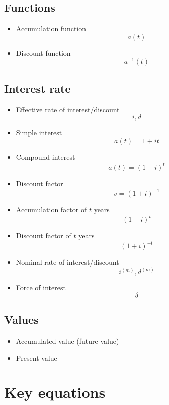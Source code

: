 \documentclass[
]{book}
\begin{document}
\hypertarget{functions}{%
\subsection*{Functions}\label{functions}}

\begin{itemize}
\item
  Accumulation function \[a(t)\]
\item
  Discount function \[a^{-1}(t)\]
\end{itemize}

\hypertarget{interest-rate-1}{%
\subsection*{Interest rate}\label{interest-rate-1}}

\begin{itemize}
\item
  Effective rate of interest/discount \[i,d\]
\item
  Simple interest \[a(t)=1+it\]
\item
  Compound interest \[a(t)=(1+i)^t\]
\item
  Discount factor \[v=(1+i)^{-1}\]
\item
  Accumulation factor of \(t\) years \[(1+i)^t\]
\item
  Discount factor of \(t\) years \[(1+i)^{-t}\]
\item
  Nominal rate of interest/discount \[i^{(m)},d^{(m)}\]
\item
  Force of interest \[\delta\]
\end{itemize}

\hypertarget{values}{%
\subsection*{Values}\label{values}}

\begin{itemize}
\item
  Accumulated value (future value)
\item
  Present value
\end{itemize}

\hypertarget{key-equations}{%
\section{Key equations}\label{key-equations}}
\end{document}
